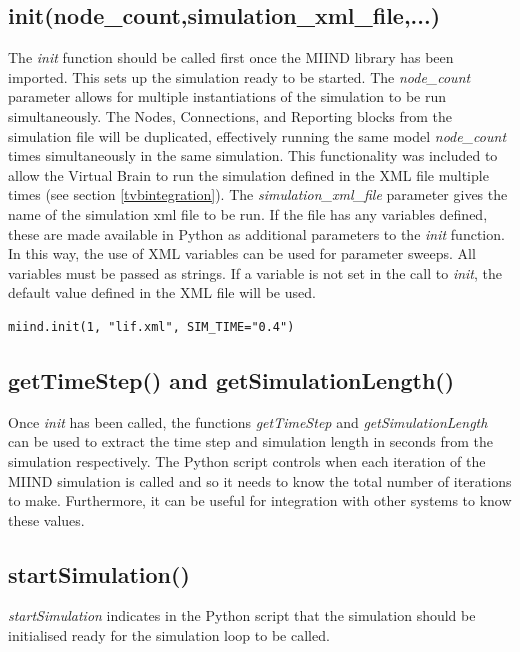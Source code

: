 \documentclass[utf8]{frontiersSCNS} %
\begin{document}
\subsection{init(node\_count,simulation\_xml\_file,...)}
The \textit{init} function should be called first once the MIIND library has been imported. This sets up the simulation ready to be started. The \textit{node\_count} parameter allows for multiple instantiations of the simulation to be run simultaneously. The Nodes, Connections, and Reporting blocks from the simulation file will be duplicated, effectively running the same model \textit{node\_count} times simultaneously in the same simulation. This functionality was included to allow the Virtual Brain to run the simulation defined in the XML file multiple times (see section \ref{tvbintegration}). The \textit{simulation\_xml\_file} parameter gives the name of the simulation xml file to be run. If the file has any variables defined, these are made available in Python as additional parameters to the \textit{init} function. In this way, the use of XML variables can be used for parameter sweeps. All variables must be passed as strings. If a variable is not set in the call to \textit{init}, the default value defined in the XML file will be used.

\begin{lstlisting}[caption={Calling init for a MIIND simulation lif.xml with the Variable SIM\_TIME set to 0.4.}]
miind.init(1, "lif.xml", SIM_TIME="0.4")
\end{lstlisting}

\subsection{getTimeStep() and getSimulationLength()}
Once \textit{init} has been called, the functions \textit{getTimeStep} and \textit{getSimulationLength} can be used to extract the time step and simulation length in seconds from the simulation respectively. The Python script controls when each iteration of the MIIND simulation is called and so it needs to know the total number of iterations to make. Furthermore, it can be useful for integration with other systems to know these values.\\

\subsection{startSimulation()}
\textit{startSimulation} indicates in the Python script that the simulation should be initialised ready for the simulation loop to be called.\\
\end{document}
